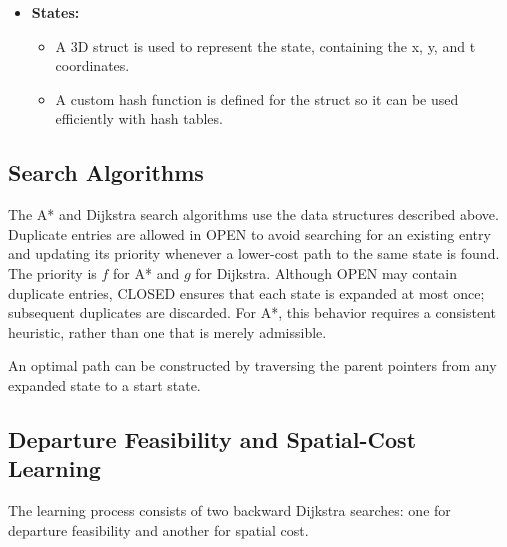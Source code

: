 \documentclass[11pt]{article}
\begin{document}
\begin{itemize}
  \item \textbf{States:}
        \begin{itemize}
          \item A 3D struct is used to represent the state, containing the x, y, and t coordinates.
          \item A custom hash function is defined for the struct so it can be used efficiently with hash tables.
        \end{itemize}
\end{itemize}

\subsection{Search Algorithms}

The A* and Dijkstra search algorithms use the data structures described above. Duplicate entries are allowed in OPEN to avoid searching for an existing entry and updating its priority whenever a lower-cost path to the same state is found. The priority is \(f\) for A* and \(g\) for Dijkstra. Although OPEN may contain duplicate entries, CLOSED ensures that each state is expanded at most once; subsequent duplicates are discarded. For A*, this behavior requires a consistent heuristic, rather than one that is merely admissible.

An optimal path can be constructed by traversing the parent pointers from any expanded state to a start state.

\subsection{Departure Feasibility and Spatial-Cost Learning}

The learning process consists of two backward Dijkstra searches: one for
departure feasibility and another for spatial cost.
\end{document}
